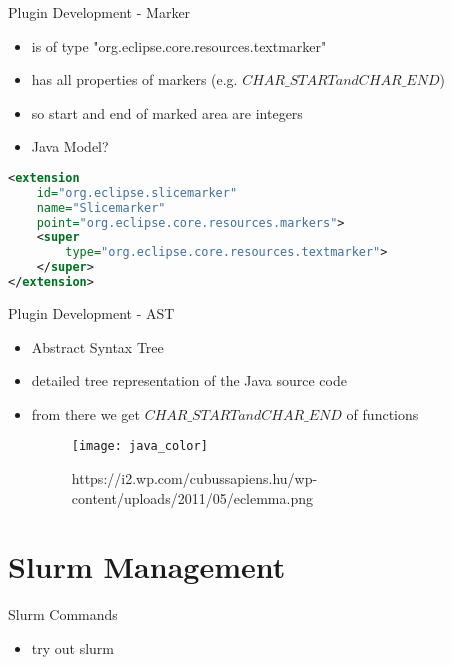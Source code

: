 \documentclass[11pt,aspectratio=169]{beamer}
\begin{document}
\begin{frame}[fragile]{Plugin Development - Marker}
  \begin{itemize}
    \item is of type "org.eclipse.core.resources.textmarker"
    \item has all properties of markers (e.g. $CHAR\_START and CHAR\_END$)
    \item so start and end of marked area are integers
    \item Java Model?
  \end{itemize}
  \begin{lstlisting}[language=XML]
<extension
    id="org.eclipse.slicemarker"
    name="Slicemarker"
    point="org.eclipse.core.resources.markers">
    <super
        type="org.eclipse.core.resources.textmarker">
    </super>
</extension>
  \end{lstlisting}
\end{frame}

\begin{frame}{Plugin Development - AST}
  \begin{itemize}
    \item Abstract Syntax Tree
    \item detailed tree representation of the Java source code
    \item from there we get $CHAR\_START and CHAR\_END$ of functions
    \begin{figure}[ht]
      \texttt{[image: java\_color]}
      \caption{https://i2.wp.com/cubussapiens.hu/wp-content/uploads/2011/05/eclemma.png}
      \label{fig3}
    \end{figure}
  \end{itemize}
\end{frame}


\section{Slurm Management}

\begin{frame}{Slurm Commands}
  \begin{itemize}
    \item try out slurm
  \end{itemize}
  
\end{frame}
\end{document}
